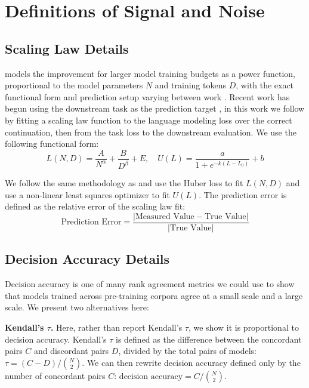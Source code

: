 \section{Definitions of Signal and Noise}


\subsection{Scaling Law Details}
\label{app:scaling-law-prediction-error}

\citet{hoffmann2022training} models the improvement for larger model training budgets as a power function, proportional to the model parameters $N$ and training tokens $D$, with the exact functional form and prediction setup varying between work \citep{pearce2024reconciling}. Recent work has begun using the downstream task as the prediction target \citep{dubey2024llama, gadre2024language}, in this work we follow \citet{bhagia2024establishing} by fitting a scaling law function to the language modeling loss over the correct continuation, then from the task loss to the downstream evaluation. We use the following functional form:
\begin{equation}
L(N, D) = \frac{A}{N^\alpha} + \frac{B}{D^\beta} + E, \quad U(L) = \frac{a}{1 + e^{-k(L-L_0)}} + b
\end{equation}

We follow the same methodology as \citet{bhagia2024establishing} and use the Huber loss to fit $L(N,D)$ and use a non-linear least squares optimizer to fit $U(L)$. The prediction error is defined as the relative error of the scaling law fit: 
\begin{equation}
\text{Prediction Error} = \frac{|\text{Measured Value} - \text{True Value}|}{|\text{True Value}|}
\end{equation}


\subsection{Decision Accuracy Details}
\label{app:decision-acc-details}

Decision accuracy is one of many rank agreement metrics we could use to show that models trained across pre-training corpora agree at a small scale and a large scale. We present two alternatives here:

\textbf{Kendall's $\tau$.} 
Here, rather than report Kendall’s $\tau$, we show it is proportional to decision accuracy. Kendall’s $\tau$ is defined as the difference between the concordant pairs $C$ and discordant pairs $D$, divided by the total pairs of models:
$\tau = (C - D) / \binom{N}{2}$.
We can then rewrite decision accuracy defined only by the number of concordant pairs $C$: 
$\text{decision accuracy} = C / \binom{N}{2}$.

